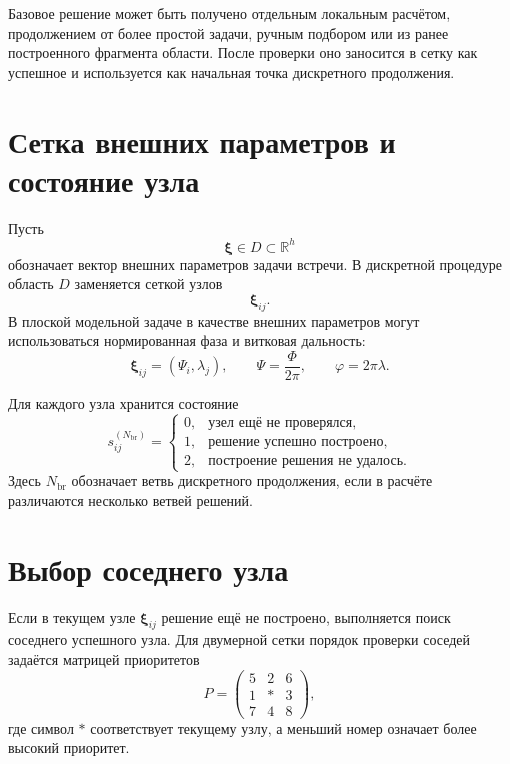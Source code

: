 Базовое решение может быть получено отдельным локальным расчётом, продолжением от более простой задачи, ручным подбором или из ранее построенного фрагмента области. После проверки оно заносится в сетку как успешное и используется как начальная точка дискретного продолжения.

\section*{Сетка внешних параметров и состояние узла}

Пусть
\begin{equation}
	\boldsymbol\xi\in D\subset\mathbb R^h
\end{equation}
обозначает вектор внешних параметров задачи встречи. В дискретной процедуре область \(D\) заменяется сеткой узлов
\begin{equation}
	\boldsymbol\xi_{ij}.
\end{equation}
В плоской модельной задаче в качестве внешних параметров могут использоваться нормированная фаза и витковая дальность:
\begin{equation}
	\boldsymbol\xi_{ij}=(\Psi_i,\lambda_j),
	\qquad
	\Psi=\frac{\Phi}{2\pi},
	\qquad
	\varphi=2\pi\lambda.
\end{equation}

Для каждого узла хранится состояние
\begin{equation}
	s_{ij}^{(N_{\mathrm{br}})}
	=
	\begin{cases}
		0, & \text{узел ещё не проверялся},\\
		1, & \text{решение успешно построено},\\
		2, & \text{построение решения не удалось}.
	\end{cases}
\end{equation}
Здесь \(N_{\mathrm{br}}\) обозначает ветвь дискретного продолжения, если в расчёте различаются несколько ветвей решений.

\section*{Выбор соседнего узла}

Если в текущем узле \(\boldsymbol\xi_{ij}\) решение ещё не построено, выполняется поиск соседнего успешного узла. Для двумерной сетки порядок проверки соседей задаётся матрицей приоритетов
\begin{equation}
	P=
	\begin{pmatrix}
		5 & 2 & 6\\
		1 & * & 3\\
		7 & 4 & 8
	\end{pmatrix},
\end{equation}
где символ \(*\) соответствует текущему узлу, а меньший номер означает более высокий приоритет.

